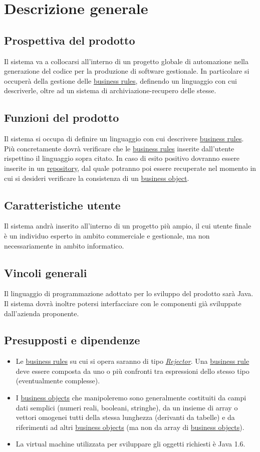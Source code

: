 \chapter{Descrizione generale}
\section{Prospettiva del prodotto}
Il sistema va a collocarsi all'interno di un progetto globale di automazione nella generazione del codice per la produzione di software gestionale. In particolare si occuper\`a della gestione delle \underline{business rules}, definendo un linguaggio con cui descriverle, oltre ad un sistema di archiviazione-recupero delle stesse.
\section{Funzioni del prodotto}
Il sistema si occupa di definire un linguaggio con cui descrivere \underline{business rules}. Pi\`u concretamente dovr\`a verificare che le \underline{business rules} inserite dall'utente rispettino il linguaggio sopra citato. In caso di esito positivo dovranno essere inserite in un \underline{repository}, dal quale potranno poi essere recuperate nel momento in cui si desideri verificare la consistenza di un \underline{business object}.
\section{Caratteristiche utente}
Il sistema andr\`a inserito all'interno di un progetto pi\`u ampio, il cui utente finale \`e un individuo esperto in ambito commerciale e gestionale, ma non necessariamente in ambito informatico.
\section{Vincoli generali}
Il linguaggio di programmazione adottato per lo sviluppo del prodotto sar\`a Java. Il sistema dovr\`a inoltre potersi interfacciare con le componenti gi\`a sviluppate dall'azienda proponente. 
\section{Presupposti e dipendenze}
\begin{itemize}
\item{Le \underline{business rules} su cui si opera saranno di tipo \textit{\underline{Rejector}}. Una \underline{business rule} deve essere composta da uno o pi\`u confronti tra espressioni dello stesso tipo (eventualmente complesse).}
\item{I \underline{business objects} che manipoleremo sono generalmente costituiti da campi dati semplici (numeri reali, booleani, stringhe), da un insieme di array o vettori omogenei tutti della stessa lunghezza (derivanti da tabelle) e da riferimenti ad altri \underline{business objects} (ma non da array di \underline{business objects}).
}
\item{La virtual machine utilizzata  per sviluppare gli oggetti richiesti \`e Java 1.6.}
\end{itemize}

